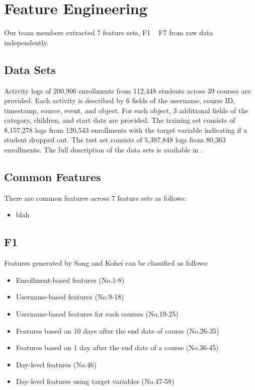 \section{Feature Engineering}
Our team members extracted 7 feature sets, F1 ~ F7 from raw data independently.

\subsection{Data Sets}
Activity logs of 200,906 enrollments from 112,448 students across 39 courses are provided.
Each activity is described by 6 fields of the username, course ID, timestamp, source, event, and object. 
For each object, 3 additional fields of the category, children, and start date are provided.
The training set consists of 8,157,278 logs from 120,543 enrollments with the target variable indicating if a student dropped out.  
The test set consists of 5,387,848 logs from 80,363 enrollments.
The full description of the data sets is available in \cite{kddcup2015_data}.

\subsection{Common Features}
There are common features across 7 feature sets as follows:
\begin{itemize}
	\item blah
\end{itemize}

\subsection{F1}

Features generated by Song and Kohei can be classified as follows:

\begin{itemize}
  \setlength\itemsep{0em}
  \item Enrollment-based features (No.1-8)
  \item Username-based features (No.9-18)
  \item Username-based features for each courses (No.19-25) 
  \item Features based on 10 days after the end date of course (No.26-35)
  \item Features based on 1 day after the end date of a course (No.36-45)
  \item Day-level features (No.46)
  \item Day-level features using target variables (No.47-58)
\end{itemize}

